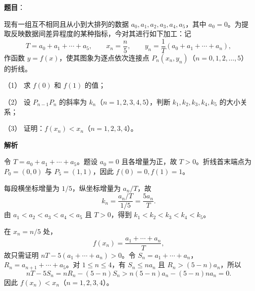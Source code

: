 \begin{answer}

\textbf{题目}：

现有一组互不相同且从小到大排列的数据 $a_0,a_1,a_2,a_3,a_4,a_5$，其中 $a_0=0$。为提取反映数据间差异程度的某种指标，今对其进行如下加工：记
\nopagebreak[4]
\[
T=a_0+a_1+\cdots+a_5,\qquad x_n=\frac{n}{5},\qquad y_n=\frac{1}{T}(a_0+a_1+\cdots+a_n),
\]
作函数 $y=f(x)$，使其图象为逐点依次连接点 $P_n(x_n,y_n)$（$n=0,1,2,\ldots,5$）的折线。

（1） 求 $f(0)$ 和 $f(1)$ 的值；

（2） 设 $P_{n-1}P_n$ 的斜率为 $k_n$（$n=1,2,3,4,5$），判断 $k_1,k_2,k_3,k_4,k_5$ 的大小关系；

（3） 证明：$f(x_n)<x_n$（$n=1,2,3,4$）。

\textbf{解析}


令 $T=a_0+a_1+\cdots+a_5$。题设 $a_0=0$ 且各增量为正，故 $T>0$。折线首末端点为 $P_0=(0,0)$ 与 $P_5=(1,1)$，因此 $f(0)=0,f(1)=1$。


每段横坐标增量为 $1/5$，纵坐标增量为 $a_n/T$，故
\nopagebreak[4]
\[
k_n=\frac{a_n/T}{1/5}=\frac{5a_n}{T}.
\]
由 $a_1<a_2<a_3<a_4<a_5$ 且 $T>0$，得到 $k_1<k_2<k_3<k_4<k_5$。


在 $x_n=n/5$ 处，
\nopagebreak[4]
\[
f(x_n)=\frac{a_1+\cdots+a_n}{T},
\]
故只需证明 $nT-5(a_1+\cdots+a_n)>0$。令 $S_n=a_1+\cdots+a_n$，$R_n=a_{n+1}+\cdots+a_5$。对 $1\le n\le4$，有 $S_n\le na_n$ 且 $R_n>(5-n)a_n$，所以
\nopagebreak[4]
\[
nT-5S_n=nR_n-(5-n)S_n>n(5-n)a_n-(5-n)na_n=0.
\]
因此 $f(x_n)<x_n$（$n=1,2,3,4$）。




\end{answer}